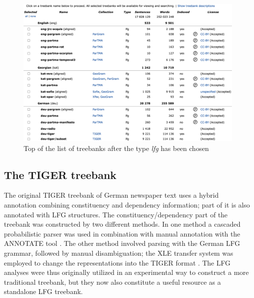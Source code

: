 \documentclass[output=paper,hidelinks]{langscibook}
\begin{document}
\begin{figure}
    \includegraphics[width=\textwidth]{figures/Treebanks/top-new-5.png}
    \caption{Top of the list of treebanks after the  type \textit{lfg} has been chosen}
    \label{fig:top}
\end{figure}


\subsection{The TIGER treebank}\label{tiger} %

The original TIGER treebank of German newspaper text \citep{Brants02tlt,brants2004} uses a hybrid annotation combining constituency and dependency information; part of it is also annotated with LFG structures.
The constituency/dependency part of the treebank was constructed by two different methods.
In one method a cascaded probabilistic parser was used in combination with manual annotation with the ANNOTATE tool \citep{Brants00}.
The other method involved parsing with the German LFG grammar, followed by manual disambiguation; the XLE transfer system was employed to change the representations into the TIGER format \citep{zinsmeisteretal02}.
The LFG analyses were thus originally utilized in an experimental way to construct a more traditional treebank, but they now also constitute a useful resource as a standalone LFG treebank.
\end{document}
